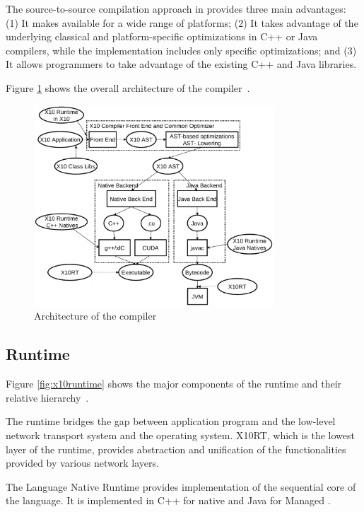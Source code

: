 The
source-to-source compilation approach in \xten provides 
three main advantages: (1) It makes \xten
available for a wide range of platforms; (2) It takes advantage of the
underlying classical and platform-specific optimizations in C++ or Java
compilers, while the \xten implementation includes only \xten specific
optimizations; and (3) It allows programmers to take advantage of the existing
C++ and Java libraries.

Figure \ref{fig:x10compiler} shows the overall architecture of the \xten
compiler~\cite{x10intro}.  
 
\begin{figure}[htpb]
    \centering
    \includegraphics[width=0.8\textwidth]{Figures/x10compiler.eps}
    \caption{Architecture of the \xten compiler}
    \label{fig:x10compiler}
\end{figure}

\subsection{\xten Runtime}
Figure \ref{fig:x10runtime} shows the major components of the \xten runtime and
their relative hierarchy~\cite{x10intro}. 

The runtime bridges the gap between 
application program and
the low-level network transport system and the operating system. X10RT, which is
the lowest layer of the \xten runtime, provides abstraction and unification of
the functionalities provided by various network layers. 

The \xten Language
Native Runtime provides implementation of the sequential core of the language.
It is implemented in C++ for native \xten and Java for Managed \xten. 

